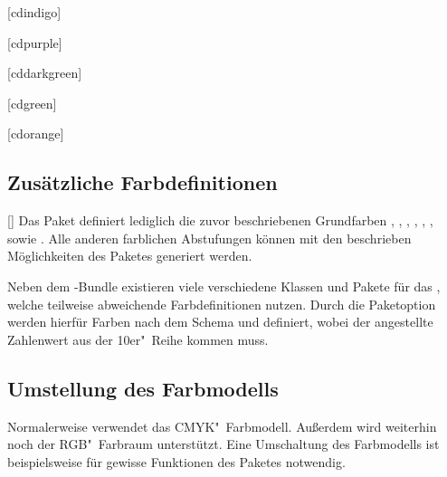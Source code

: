 \begin{Bundle*}{}
\begin{Declaration}{[cdindigo]}
\begin{Declaration}{[cdpurple]}
\begin{Declaration}{[cddarkgreen]}
\begin{Declaration}{[cdgreen]}
\printdeclarationlist%
\end{Declaration}
\end{Declaration}
\end{Declaration}
\end{Declaration}

\begin{Declaration}{[cdorange]}
\printdeclarationlist%
\end{Declaration}



\subsection{Zusätzliche Farbdefinitionen}
%
\begin{Declaration}{}[]
\printdeclarationlist%
%
Das Paket  definiert lediglich die zuvor beschriebenen 
Grundfarben , , , , 
, ,  sowie . 
Alle anderen farblichen Abstufungen können mit den beschrieben Möglichkeiten 
des Paketes  generiert werden.
\end{Declaration}

\begin{Declaration}{}
\printdeclarationlist%
%
Neben dem \TUDScript-Bundle existieren viele verschiedene Klassen und Pakete 
für das \CD, welche teilweise abweichende Farbdefinitionen nutzen. Durch die 
Paketoption  werden hierfür Farben nach dem Schema 
 und  definiert, wobei 
der angestellte Zahlenwert aus der 10er"~Reihe kommen muss.
\end{Declaration}



\subsection{Umstellung des Farbmodells}
%
%
Normalerweise verwendet  das CMYK"~Farbmodell. Außerdem 
wird weiterhin noch der RGB"~Farbraum unterstützt. Eine Umschaltung des 
Farbmodells ist beispielsweise für gewisse Funktionen des Paketes 
 notwendig.


\end{Bundle*}

